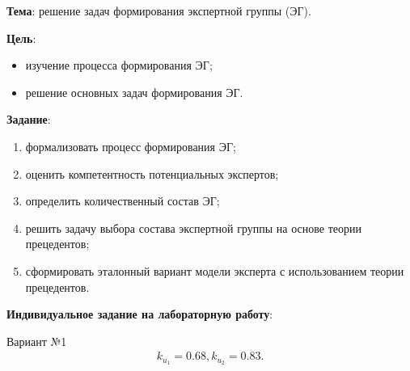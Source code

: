 


\newcommand{\labnumber}{1} %



\usepackage{systeme}
\usepackage{longtable,tabu}
\usepackage{multirow}
\usepackage{array,multirow}
\usepackage{pdflscape}
\usepackage{afterpage}
\usepackage{bm}

\graphicspath{{../figures/}}


\Russian


\addtocounter{page}{1}

\textbf{Тема}: решение задач формирования экспертной группы (ЭГ).

\textbf{Цель}: 
\begin{itemize}
	\item изучение процесса формирования ЭГ;
	\item решение основных задач формирования ЭГ.
\end{itemize}

\textbf{Задание}:
\begin{enumerate}[label={\arabic*)}]
	\item формализовать процесс формирования ЭГ;
	\item оценить компетентность потенциальных экспертов;
	\item определить количественный состав ЭГ;
	\item решить задачу выбора состава экспертной группы на основе теории прецедентов;
	\item сформировать эталонный вариант модели эксперта с использованием теории прецедентов.
\end{enumerate}

\textbf{Индивидуальное задание на лабораторную работу}:

Вариант №1
\begin{align*}
	k_{u_1}=0.68, k_{u_2}=0.83.
\end{align*}

